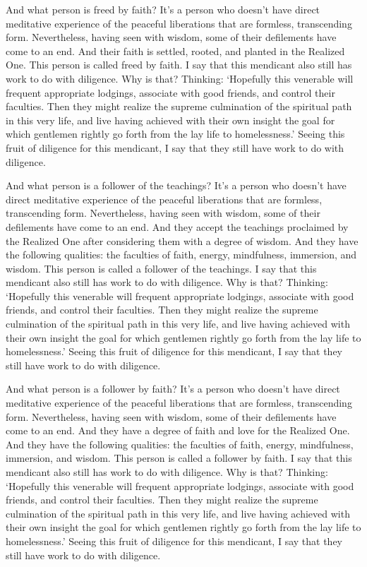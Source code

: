 \documentclass[12pt,openany]{book}%
\begin{document}
And what person is freed by faith? It’s a person who doesn’t have direct meditative experience of the peaceful liberations that are formless, transcending form. Nevertheless, having seen with wisdom, some of their defilements have come to an end. And their faith is settled, rooted, and planted in the Realized One. This person is called freed by faith. I say that this mendicant also still has work to do with diligence. Why is that? Thinking: ‘Hopefully this venerable will frequent appropriate lodgings, associate with good friends, and control their faculties. Then they might realize the supreme culmination of the spiritual path in this very life, and live having achieved with their own insight the goal for which gentlemen rightly go forth from the lay life to homelessness.’ Seeing this fruit of diligence for this mendicant, I say that they still have work to do with diligence. 

And what person is a follower of the teachings? It’s a person who doesn’t have direct meditative experience of the peaceful liberations that are formless, transcending form. Nevertheless, having seen with wisdom, some of their defilements have come to an end. And they accept the teachings proclaimed by the Realized One after considering them with a degree of wisdom. And they have the following qualities: the faculties of faith, energy, mindfulness, immersion, and wisdom. This person is called a follower of the teachings. I say that this mendicant also still has work to do with diligence. Why is that? Thinking: ‘Hopefully this venerable will frequent appropriate lodgings, associate with good friends, and control their faculties. Then they might realize the supreme culmination of the spiritual path in this very life, and live having achieved with their own insight the goal for which gentlemen rightly go forth from the lay life to homelessness.’ Seeing this fruit of diligence for this mendicant, I say that they still have work to do with diligence. 

And what person is a follower by faith? It’s a person who doesn’t have direct meditative experience of the peaceful liberations that are formless, transcending form. Nevertheless, having seen with wisdom, some of their defilements have come to an end. And they have a degree of faith and love for the Realized One. And they have the following qualities: the faculties of faith, energy, mindfulness, immersion, and wisdom. This person is called a follower by faith. I say that this mendicant also still has work to do with diligence. Why is that? Thinking: ‘Hopefully this venerable will frequent appropriate lodgings, associate with good friends, and control their faculties. Then they might realize the supreme culmination of the spiritual path in this very life, and live having achieved with their own insight the goal for which gentlemen rightly go forth from the lay life to homelessness.’ Seeing this fruit of diligence for this mendicant, I say that they still have work to do with diligence. 
\end{document}

